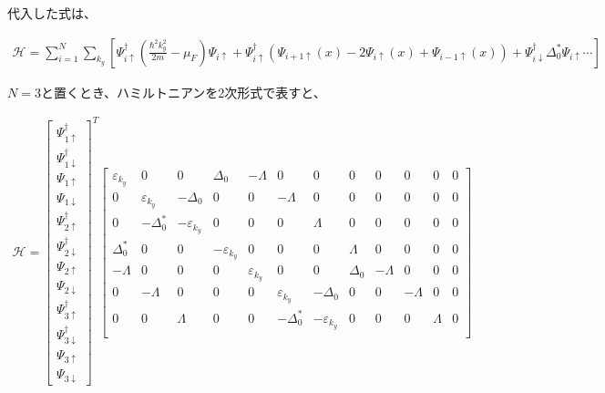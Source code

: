 \documentclass{jsarticle}
\begin{document}
		代入した式は、

		\begin{align}
			\mathcal{H}= \sum_{i=1}^N \sum_{k_y}
			\left[ \Psi^\dagger_{i\uparrow} \left( \frac{\hbar^2k_y^2}{2m}-\mu_F \right)\Psi_{i\uparrow}
			+\Psi^\dagger_{i\uparrow} \left( \Psi_{i+1\uparrow}\left(x\right)-2\Psi_{i\uparrow}\left(x\right)+\Psi_{i-1\uparrow}\left(x\right)
			\right)+\Psi^\dagger_{i\downarrow} \Delta_0^\ast \Psi_{i\uparrow} \cdots
			\right]
			\label{hamil3}
		\end{align}

		$N=3$と置くとき、ハミルトニアンを2次形式で表すと、

		\begin{align}
			\mathcal{H}=
			\begin{bmatrix}
				\Psi_{1\uparrow}^\dagger \\
				\Psi_{1\downarrow}^\dagger \\
				\Psi_{1\uparrow} \\
				\Psi_{1\downarrow} \\
				\Psi_{2\uparrow}^\dagger \\
				\Psi_{2\downarrow}^\dagger \\
				\Psi_{2\uparrow} \\
				\Psi_{2\downarrow} \\
				\Psi_{3\uparrow}^\dagger \\
				\Psi_{3\downarrow}^\dagger \\
				\Psi_{3\uparrow} \\
				\Psi_{3\downarrow}
			\end{bmatrix}
			^T
			\begin{bmatrix}
				\varepsilon_{k_y} & 0 & 0 & \Delta_0 & -\varLambda & 0 & 0 & 0 & 0 & 0 & 0 & 0 \\
				0 & \varepsilon_{k_y} & -\Delta_0 & 0 & 0 & -\varLambda & 0 & 0 & 0 & 0 & 0 & 0 \\
				0 & -\Delta_0^\ast & -\varepsilon_{k_y} & 0 & 0 & 0 & \varLambda & 0 & 0 & 0 & 0 & 0 \\
				\Delta_0^\ast & 0 & 0 & -\varepsilon_{k_y} & 0 & 0 & 0 & \varLambda & 0 & 0 & 0 & 0 \\
				-\varLambda & 0 & 0 & 0 & \varepsilon_{k_y} & 0 & 0 & \Delta_0 & -\varLambda & 0 & 0 & 0 \\
				0 & -\varLambda & 0 & 0 & 0 & \varepsilon_{k_y} & -\Delta_0 & 0 & 0 & -\varLambda & 0 & 0 \\
				0 & 0 & \varLambda & 0 & 0 & -\Delta_0^\ast & -\varepsilon_{k_y} & 0 & 0 & 0 & \varLambda & 0 \\

\end{bmatrix}
\end{align}
\end{document}
